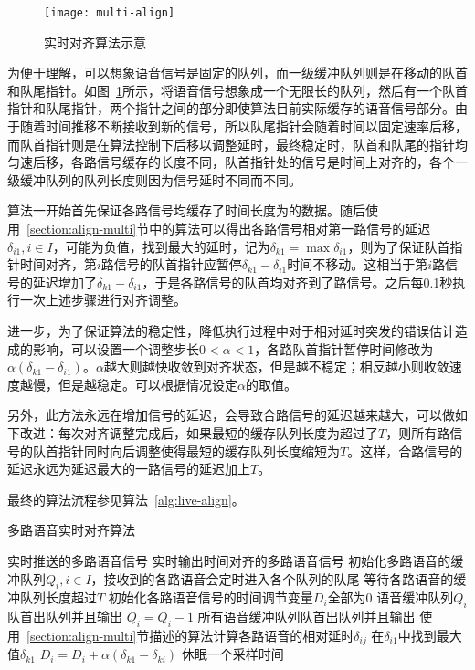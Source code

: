 \begin{figure}
\centering
\texttt{[image: multi-align]}
\caption{实时对齐算法示意\label{fig:multi-align}}
\end{figure}

为便于理解，可以想象语音信号是固定的队列，而一级缓冲队列则是在移动的队首和队尾指针。如图~\ref{fig:multi-align}所示，将语音信号想象成一个无限长的队列，然后有一个队首指针和队尾指针，两个指针之间的部分即使算法目前实际缓存的语音信号部分。由于随着时间推移不断接收到新的信号，所以队尾指针会随着时间以固定速率后移，而队首指针则是在算法控制下后移以调整延时，最终稳定时，队首和队尾的指针均匀速后移，各路信号缓存的长度不同，队首指针处的信号是时间上对齐的，各个一级缓冲队列的队列长度则因为信号延时不同而不同。

算法一开始首先保证各路信号均缓存了时间长度为的数据。随后使用~\ref{section:align-multi}节中的算法可以得出各路信号相对第一路信号的延迟$\delta_{i1}, i \in I$，可能为负值，找到最大的延时，记为$\delta_{k1} = \max \delta_{i1}$，则为了保证队首指针时间对齐，第$i$路信号的队首指针应暂停$\delta_{k1}-\delta_{i1}$时间不移动。这相当于第$i$路信号的延迟增加了$\delta_{k1}-\delta_{i1}$，于是各路信号的队首均对齐到了路信号。之后每0.1秒执行一次上述步骤进行对齐调整。

进一步，为了保证算法的稳定性，降低执行过程中对于相对延时突发的错误估计造成的影响，可以设置一个调整步长$0<\alpha<1$，各路队首指针暂停时间修改为$\alpha(\delta_{k1}-\delta_{i1})$。$\alpha$越大则越快收敛到对齐状态，但是越不稳定；相反越小则收敛速度越慢，但是越稳定。可以根据情况设定$\alpha$的取值。

另外，此方法永远在增加信号的延迟，会导致合路信号的延迟越来越大，可以做如下改进：每次对齐调整完成后，如果最短的缓存队列长度为超过了$T$，则所有路信号的队首指针同时向后调整使得最短的缓存队列长度缩短为$T$。这样，合路信号的延迟永远为延迟最大的一路信号的延迟加上$T$。

最终的算法流程参见算法~\ref{alg:live-align}。

\begin{algorithm}
    \caption{多路语音实时对齐算法}
    \label{alg:live-align}
\begin{algorithmic}[1]
\INPUT
    \Statex 实时推送的多路语音信号
\OUTPUT
    \Statex 实时输出时间对齐的多路语音信号
\State 初始化多路语音的缓冲队列$Q_i, i\in I$，接收到的各路语音会定时进入各个队列的队尾
\State 等待各路语音的缓冲队列长度超过$T$
\State 初始化各路语音信号的时间调节变量$D_i$全部为0
            \State 语音缓冲队列$Q_i$队首出队列并且输出
        \Else
            \State $Q_i = Q_i - 1$
        \EndIf
    \EndFor
        \State 所有语音缓冲队列队首出队列并且输出
    \EndIf
        \State 使用~\ref{section:align-multi}节描述的算法计算各路语音的相对延时$\delta_{ij}$
        \State 在$\delta_{i1}$中找到最大值$\delta_{k1}$
            \State $D_i = D_i + \alpha(\delta_{k1}-\delta_{ki})$
        \EndFor
    \EndIf
    \State 休眠一个采样时间
\EndWhile
\end{algorithmic}
\end{algorithm}

